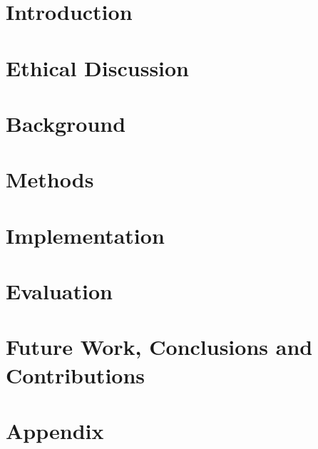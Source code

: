 \documentclass[12pt,twoside]{report}
\begin{document}
\tableofcontents


\clearpage{\pagestyle{empty}\clearpage}
\setcounter{page}{1}
\fancyhead[LE,RO]{\slshape \rightmark}
\fancyhead[LO,RE]{\slshape \leftmark}

\chapter{Introduction}


\chapter{Ethical Discussion}

\label{sect:ethics}

\chapter{Background}

\label{sect:3d}

\label{sect:nix}

\chapter{Methods}

\label{sect:projection}

\chapter{Implementation}

\label{sect:overview}

\label{sect:buildsystem}

\label{sect:renderer}

\label{sect:tracker}

\label{sect:userstudy}

\chapter{Evaluation}
 
\label{sect:eval-volsim}

\label{sect:eval-userstudy}

\chapter{Future Work, Conclusions and Contributions}

\label{sect:conclusions}

\printbibliography

\appendix
\chapter{Appendix}



\end{document}
